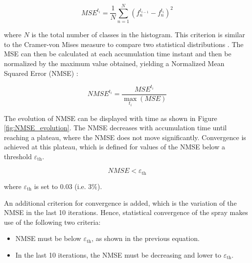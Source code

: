 \begin{equation}
MSE^{t_i} = \frac{1}{N} \sum_{n=1}^N \left( f_n^{t_{i-1}} - f_n^{t_i}  \right)^2
\end{equation}

where $N$ is the total number of classes in the histogram. This criterion is similar to the Cramer-von Mises measure to compare two statistical distributions . The MSE can then be calculated at each accumulation time instant and then be normalized by the maximum value obtained, yielding a Normalized Mean Squared Error (NMSE) :

\begin{equation}
NMSE^{t_i} = \frac{MSE^{t_i}}{\max_{t_i} \left( MSE \right)}
\end{equation}

The evolution of NMSE can be displayed with time as shown in Figure \ref{fig:NMSE_evolution}. The NMSE decreases with accumulation time until reaching a plateau, where the NMSE does not move significantly. Convergence is achieved at this plateau, which is defined for values of the NMSE below a threshold $\varepsilon_\mathrm{th}$.

\begin{equation}
NMSE < \varepsilon_\mathrm{th}
\end{equation}

where $\varepsilon_\mathrm{th}$ is set to $0.03$ (i.e. $3 \%$).

An additional criterion for convergence is added, which is the variation of the NMSE in the last 10 iterations. Hence, statistical convergence of the spray makes use of the following two criteria:

\begin{itemize}

	\item NMSE must be below $\varepsilon_\mathrm{th}$, as shown in the previous equation.
	
	\item In the last 10 iterations, the NMSE must be decreasing and lower to $\varepsilon_\mathrm{th}$.

\end{itemize}


